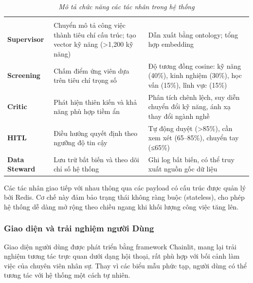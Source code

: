 \documentclass{article}
\begin{document}
\begin{itemize}[topsep=0pt, itemsep=4pt, leftmargin=40pt]
\begin{longtable}{|
  >{\raggedright\arraybackslash}p{}|
  >{\raggedright\arraybackslash}p{}|
  >{\raggedright\arraybackslash}p{}|}
  \hline
  \endfoot

  \hline
  \caption{\centering\textit{Mô tả chức năng các tác nhân trong hệ thống}}
  \label{tab:agent-functions} \\
  \endlastfoot

  \textbf{Supervisor} & 
  Chuyển mô tả công việc thành tiêu chí cấu trúc; tạo vector kỹ năng (>1,200 kỹ năng) & 
  Dẫn xuất bằng ontology; tổng hợp embedding \\ 
  \hline

  \textbf{Screening} & 
  Chấm điểm ứng viên dựa trên tiêu chí trọng số & 
  Độ tương đồng cosine: kỹ năng (40\%), kinh nghiệm (30\%), học vấn (15\%), lĩnh vực (15\%) \\ 
  \hline

  \textbf{Critic} & 
  Phát hiện thiên kiến và khả năng phù hợp tiềm ẩn & 
  Phân tích chênh lệch, suy diễn chuyển đổi kỹ năng, ánh xạ thay đổi ngành nghề \\ 
  \hline

  \textbf{HITL} & 
  Điều hướng quyết định theo ngưỡng độ tin cậy & 
  Tự động duyệt (>85\%), cần xem xét (65–85\%), chuyển tay (≤65\%) \\ 
  \hline

  \textbf{Data Steward} & 
  Lưu trữ bất biến và theo dõi chỉ số hệ thống & 
  Ghi log bất biến, có thể truy xuất nguồn gốc dữ liệu \\

\end{longtable}

Các tác nhân giao tiếp với nhau thông qua các payload có cấu trúc được quản lý bởi Redis. Cơ chế này đảm bảo trạng thái không ràng buộc (stateless), cho phép hệ thống dễ dàng mở rộng theo chiều ngang khi khối lượng công việc tăng lên.

\subsubsection{Giao diện và trải nghiệm người Dùng}
Giao diện người dùng được phát triển bằng framework Chainlit, mang lại trải nghiệm tương tác trực quan dưới dạng hội thoại, rất phù hợp với bối cảnh làm việc của chuyên viên nhân sự. Thay vì các biểu mẫu phức tạp, người dùng có thể tương tác với hệ thống một cách tự nhiên.


\end{itemize}
\end{document}
